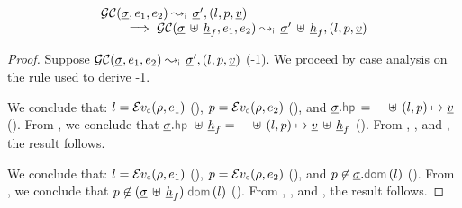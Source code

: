 \begin{lemma}\label{frame:getcell}
$$
\begin{array}{l}
% 
\absgetcellrule{\instrumented}{\istate, \jsilexpr_1, \jsilexpr_2}{\istate', (\loc, p, \ival)} \\ \quad \quad
  \implies \absgetcellrule{\instrumented}{\istate \dunion \iheap_f, \jsilexpr_1, \jsilexpr_2}{\istate' \dunion \iheap_f, (\loc, p, \ival)} \end{array}
$$
\end{lemma}
\begin{proof}
Suppose $\absgetcellrule{\instrumented}{\istate, \jsilexpr_1, \jsilexpr_2}{\istate', (\loc, p, \ival)}$ (\hyp{1}). 
We proceed by case analysis on the rule used to derive \hyp{1}. 
\vspace{3pt} 

\noindent {} 
We conclude that: 
$\loc = \evalexpr{\concrete}(\store, \jsilexpr_1)$ (), 
$p = \evalexpr{\concrete}(\store, \jsilexpr_2)$ (), and 
$\istate.\hpsel = - \, \uplus \, (\loc, p) \mapsto \ival$ (). 
From , we conclude that $\istate.\hpsel \dunion \iheap_f =   - \, \uplus \, (\loc, p) \mapsto \ival \dunion \iheap_f$ (). 
From , , and , the result follows. 
\vspace{5pt}

\noindent {} 
We conclude that: 
$\loc = \evalexpr{\concrete}(\store, \jsilexpr_1)$ (), 
$p = \evalexpr{\concrete}(\store, \jsilexpr_2)$ (), and 
$p \not\in \istate.\domsel(\loc)$ (). 
From , we conclude that $p \not\in (\istate \dunion \iheap_f).\domsel(\loc)$ (). 
From , , and , the result follows. 
\end{proof}



